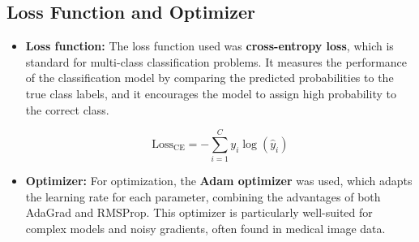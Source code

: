 
\subsection{Loss Function and Optimizer}

\begin{itemize}
    \item \textbf{Loss function:} The loss function used was \textbf{cross-entropy loss}, which is 
    standard for multi-class classification problems. It measures the performance of the 
    classification model by comparing the predicted probabilities to the true class labels, and it 
    encourages the model to assign high probability to the correct class.

    \begin{center}
    \[
    \text{Loss}_{\text{CE}} = - \sum_{i=1}^{C} y_i \log(\hat{y}_i)
    \]
    \end{center}

    \item \textbf{Optimizer:} For optimization, the \textbf{Adam optimizer} was used, which adapts 
    the learning rate for each parameter, combining the advantages of both AdaGrad and RMSProp. 
    This optimizer is particularly well-suited for complex models and noisy gradients, often found 
    in medical image data.
\end{itemize}
